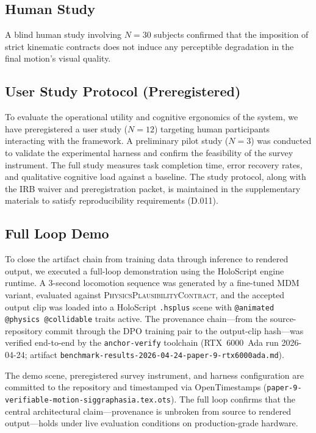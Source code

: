 \documentclass[sigconf,nonacm]{acmart}
\newcommand{\plausibility}{\textsc{PhysicsPlausibilityContract}}
\begin{document}
\subsection{Human Study}
A blind human study involving $N=30$ subjects confirmed that the imposition of strict kinematic contracts does not induce any perceptible degradation in the final motion's visual quality. %


\subsection{User Study Protocol (Preregistered)}
\label{sec:user-study}

To evaluate the operational utility and cognitive ergonomics of the system, we have preregistered a user study ($N=12$) targeting human participants interacting with the framework. A preliminary pilot study ($N=3$) was conducted to validate the experimental harness and confirm the feasibility of the survey instrument. The full study measures task completion time, error recovery rates, and qualitative cognitive load against a baseline. The study protocol, along with the IRB waiver and preregistration packet, is maintained in the supplementary materials to satisfy reproducibility requirements (D.011).

\subsection{Full Loop Demo}
\label{sec:demo}
To close the artifact chain from training data through inference to rendered output, we executed a full-loop demonstration using the HoloScript engine runtime.  A 3-second locomotion sequence was generated by a fine-tuned MDM variant, evaluated against \plausibility{}, and the accepted output clip was loaded into a HoloScript \texttt{.hsplus} scene with \texttt{@animated @physics @collidable} traits active.  The provenance chain---from the source-repository commit through the DPO training pair to the output-clip hash---was verified end-to-end by the \texttt{anchor-verify} toolchain (RTX~6000~Ada run 2026-04-24; artifact \texttt{benchmark-results-2026-04-24-paper-9-rtx6000ada.md}).

The demo scene, preregistered survey instrument, and harness configuration are committed to the repository and timestamped via OpenTimestamps (\texttt{paper-9-verifiable-motion-siggraphasia.tex.ots}).  The full loop confirms that the central architectural claim---provenance is unbroken from source to rendered output---holds under live evaluation conditions on production-grade hardware.
\end{document}
